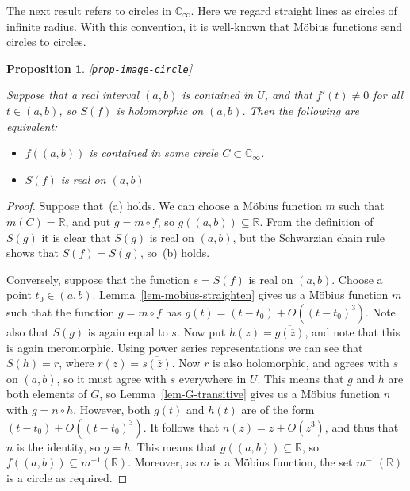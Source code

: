 \documentclass[reqno]{amsart}
\newcommand{\lbl}[1]{\label{#1}\textup{[\texttt{#1}]}\par}
\newcommand{\lbl}{\label}
\newcommand{\R}         {{\mathbb{R}}}
\newcommand{\C}         {{\mathbb{C}}}
\newcommand{\ov}[1]     {\overline{#1}}
\newcommand{\sse}       {\subseteq}
\renewcommand{\:}{\colon}
\newtheorem{proposition}[theorem]{Proposition}
\theoremstyle{definition}
\begin{document}
The next result refers to circles in $\C_\infty$.  Here we regard
straight lines as circles of infinite radius.  With this convention,
it is well-known that M\"obius functions send circles to circles.
\begin{proposition}\lbl{prop-image-circle}
 Suppose that a real interval $(a,b)$ is contained in $U$, and that
 $f'(t)\neq 0$ for all $t\in(a,b)$, so $S(f)$ is holomorphic on
 $(a,b)$.  Then the following are equivalent:
 \begin{itemize}
  \item[(a)] $f((a,b))$ is contained in some circle
   $C\subset\C_\infty$.
  \item[(b)] $S(f)$ is real on $(a,b)$
 \end{itemize}
\end{proposition}
\begin{proof}
 Suppose that~(a) holds.  We can choose a M\"obius function $m$ such
 that $m(C)=\R$, and put $g=m\circ f$, so $g((a,b))\sse\R$.  From the
 definition of $S(g)$ it is clear that $S(g)$ is real on $(a,b)$, but
 the Schwarzian chain rule shows that $S(f)=S(g)$, so~(b) holds.

 Conversely, suppose that the function $s=S(f)$ is real on $(a,b)$.
 Choose a point $t_0\in(a,b)$.  Lemma~\ref{lem-mobius-straighten}
 gives us a M\"obius function $m$ such that the function $g=m\circ f$
 has $g(t)=(t-t_0)+O((t-t_0)^3)$.  Note also that $S(g)$ is again
 equal to $s$.  Now put $h(z)=\ov{g(\ov{z})}$, and note that this is
 again meromorphic.  Using power series representations we can see
 that $S(h)=r$, where $r(z)=\ov{s(\ov{z})}$.  Now $r$ is also
 holomorphic, and agrees with $s$ on $(a,b)$, so it must agree with
 $s$ everywhere in $U$.  This means that $g$ and $h$ are both elements
 of $G$, so Lemma~\ref{lem-G-transitive} gives us a M\"obius
 function $n$ with $g=n\circ h$.  However, both $g(t)$ and $h(t)$ are
 of the form $(t-t_0)+O((t-t_0)^3)$.  It follows that $n(z)=z+O(z^3)$,
 and thus that $n$ is the identity, so $g=h$.  This means that
 $g((a,b))\sse\R$, so $f((a,b))\sse m^{-1}(\R)$.  Moreover, as $m$ is
 a M\"obius function, the set $m^{-1}(\R)$ is a circle as required.
\end{proof}
\end{document}
